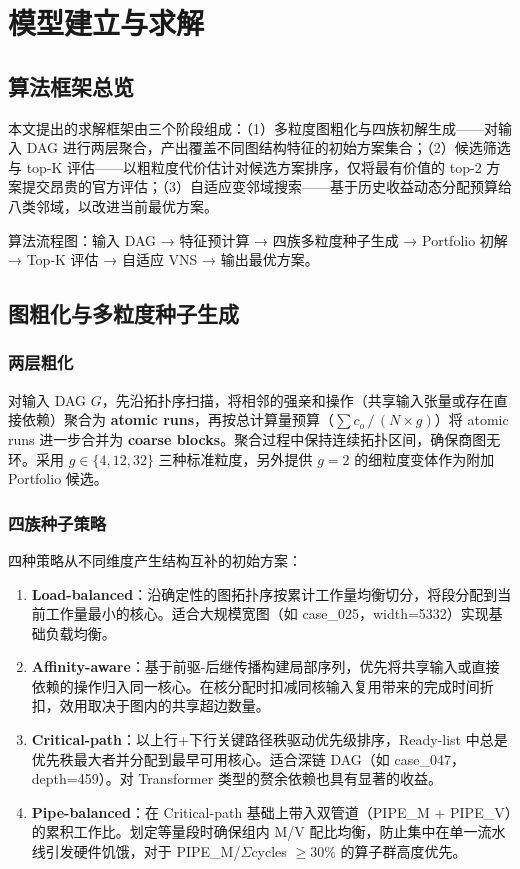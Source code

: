 \documentclass[bwprint]{gmcmthesis}
\begin{document}
\section{模型建立与求解}

\subsection{算法框架总览}

本文提出的求解框架由三个阶段组成：（1）多粒度图粗化与四族初解生成——对输入 DAG 进行两层聚合，产出覆盖不同图结构特征的初始方案集合；（2）候选筛选与 top-K 评估——以粗粒度代价估计对候选方案排序，仅将最有价值的 top-2 方案提交昂贵的官方评估；（3）自适应变邻域搜索——基于历史收益动态分配预算给八类邻域，以改进当前最优方案。

算法流程图：输入 DAG → 特征预计算 → 四族多粒度种子生成 → Portfolio 初解 → Top-K 评估 → 自适应 VNS → 输出最优方案。

\subsection{图粗化与多粒度种子生成}

\subsubsection{两层粗化}

对输入 DAG $G$，先沿拓扑序扫描，将相邻的强亲和操作（共享输入张量或存在直接依赖）聚合为 \textbf{atomic runs}，再按总计算量预算（$\sum c_o \,/\, (N \times g)$）将 atomic runs 进一步合并为 \textbf{coarse blocks}。聚合过程中保持连续拓扑区间，确保商图无环。采用 $g \in \{4, 12, 32\}$ 三种标准粒度，另外提供 $g=2$ 的细粒度变体作为附加 Portfolio 候选。

\subsubsection{四族种子策略}

四种策略从不同维度产生结构互补的初始方案：

\begin{enumerate}
  \item \textbf{Load-balanced}：沿确定性的图拓扑序按累计工作量均衡切分，将段分配到当前工作量最小的核心。适合大规模宽图（如 case\_025，width=5332）实现基础负载均衡。
  \item \textbf{Affinity-aware}：基于前驱-后继传播构建局部序列，优先将共享输入或直接依赖的操作归入同一核心。在核分配时扣减同核输入复用带来的完成时间折扣，效用取决于图内的共享超边数量。
  \item \textbf{Critical-path}：以上行+下行关键路径秩驱动优先级排序，Ready-list 中总是优先秩最大者并分配到最早可用核心。适合深链 DAG（如 case\_047，depth=459）。对 Transformer 类型的赘余依赖也具有显著的收益。
  \item \textbf{Pipe-balanced}：在 Critical-path 基础上带入双管道（PIPE\_M + PIPE\_V）的累积工作比。划定等量段时确保组内 M/V 配比均衡，防止集中在单一流水线引发硬件饥饿，对于 PIPE\_M/$\Sigma$cycles $\geq 30\%$ 的算子群高度优先。
\end{enumerate}
\end{document}
